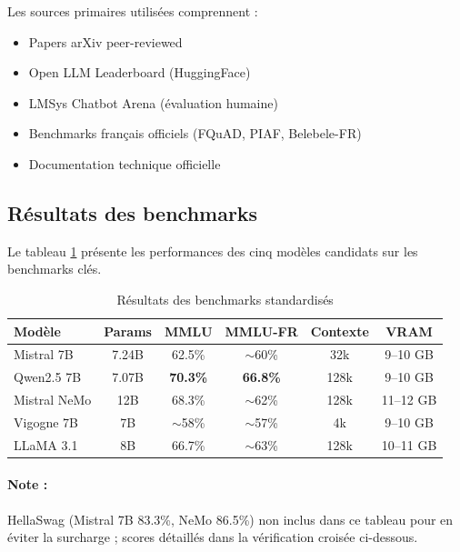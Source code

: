 Les sources primaires utilisées comprennent :

\begin{itemize}
    \item Papers arXiv peer-reviewed
    
    \item Open LLM Leaderboard (HuggingFace)
    
    \item LMSys Chatbot Arena (évaluation humaine)
    
    \item Benchmarks français officiels (FQuAD, PIAF, Belebele-FR)
    
    \item Documentation technique officielle
\end{itemize}

\subsection{Résultats des benchmarks}

Le tableau \ref{tab:benchmark_results} présente les performances des cinq modèles candidats sur les benchmarks clés.

\begin{table}[h]
\centering
\small
\caption{Résultats des benchmarks standardisés}
\label{tab:benchmark_results}
\begin{tabular}{@{}lccccc@{}}
\toprule
\textbf{Modèle} & \textbf{Params} & \textbf{MMLU} & \textbf{MMLU-FR} & \textbf{Contexte} & \textbf{VRAM} \\ \midrule
Mistral 7B & 7.24B & 62.5\% & $\sim$60\% & 32k & 9--10 GB \\
Qwen2.5 7B & 7.07B & \textbf{70.3\%} & \textbf{66.8\%} & 128k & 9--10 GB \\
Mistral NeMo & 12B & 68.3\% & $\sim$62\% & 128k & 11--12 GB \\
Vigogne 7B & 7B & $\sim$58\% & $\sim$57\% & 4k & 9--10 GB \\
LLaMA 3.1 & 8B & 66.7\% & $\sim$63\% & 128k & 10--11 GB \\ \bottomrule
\end{tabular}
\end{table}
\paragraph{Note :} HellaSwag (Mistral 7B 83.3\%, NeMo 86.5\%) non inclus dans ce tableau pour en éviter la surcharge ; scores détaillés dans la vérification croisée ci-dessous.

